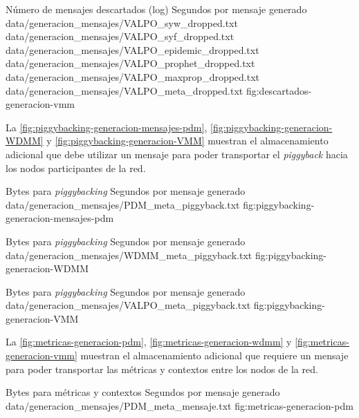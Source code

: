 {
\graficoProtocolosLog
{Número de mensajes descartados (log)}
{Segundos por mensaje generado}
{data/generacion_mensajes/VALPO_syw_dropped.txt}
{data/generacion_mensajes/VALPO_syf_dropped.txt}
{data/generacion_mensajes/VALPO_epidemic_dropped.txt}
{data/generacion_mensajes/VALPO_prophet_dropped.txt}
{data/generacion_mensajes/VALPO_maxprop_dropped.txt}
{data/generacion_mensajes/VALPO_meta_dropped.txt}
}{fig:descartados-generacion-vmm}



La \ref{fig:piggybacking-generacion-mensajes-pdm}, 
\ref{fig:piggybacking-generacion-WDMM} y
\ref{fig:piggybacking-generacion-VMM} muestran el almacenamiento adicional que
debe utilizar un mensaje para poder transportar el \textit{piggyback} hacia los
nodos participantes de la red.


{
\graficoProtocolo
{Bytes para \textit{piggybacking}}
{Segundos por mensaje generado}
{data/generacion_mensajes/PDM_meta_piggyback.txt}
}{fig:piggybacking-generacion-mensajes-pdm}


{
\graficoProtocolo
{Bytes para \textit{piggybacking}}
{Segundos por mensaje generado}
{data/generacion_mensajes/WDMM_meta_piggyback.txt}
}{fig:piggybacking-generacion-WDMM}


{
\graficoProtocolo
{Bytes para \textit{piggybacking}}
{Segundos por mensaje generado}
{data/generacion_mensajes/VALPO_meta_piggyback.txt}
}{fig:piggybacking-generacion-VMM}


La \ref{fig:metricas-generacion-pdm}, 
\ref{fig:metricas-generacion-wdmm} y
\ref{fig:metricas-generacion-vmm} muestran el almacenamiento adicional que
requiere un mensaje para poder transportar las métricas y contextos entre los
nodos de la red.

{
\graficoProtocolo
{Bytes para métricas y contextos}
{Segundos por mensaje generado}
{data/generacion_mensajes/PDM_meta_mensaje.txt}
}{fig:metricas-generacion-pdm}

